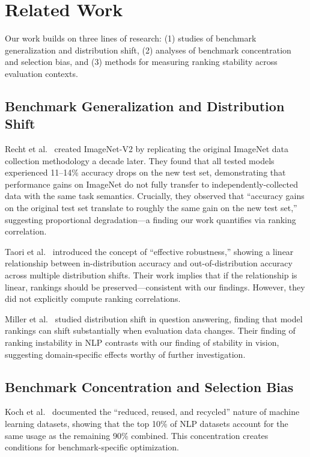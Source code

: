 \section{Related Work}
\label{sec:related}

Our work builds on three lines of research: (1) studies of benchmark generalization and distribution shift, (2) analyses of benchmark concentration and selection bias, and (3) methods for measuring ranking stability across evaluation contexts.

\subsection{Benchmark Generalization and Distribution Shift}

Recht et al.~\cite{recht2019imagenet} created ImageNet-V2 by replicating the original ImageNet data collection methodology a decade later. They found that all tested models experienced 11--14\% accuracy drops on the new test set, demonstrating that performance gains on ImageNet do not fully transfer to independently-collected data with the same task semantics. Crucially, they observed that ``accuracy gains on the original test set translate to roughly the same gain on the new test set,'' suggesting proportional degradation---a finding our work quantifies via ranking correlation.

Taori et al.~\cite{taori2020measuring} introduced the concept of ``effective robustness,'' showing a linear relationship between in-distribution accuracy and out-of-distribution accuracy across multiple distribution shifts. Their work implies that if the relationship is linear, rankings should be preserved---consistent with our findings. However, they did not explicitly compute ranking correlations.

Miller et al.~\cite{miller2021effect} studied distribution shift in question answering, finding that model rankings can shift substantially when evaluation data changes. Their finding of ranking instability in NLP contrasts with our finding of stability in vision, suggesting domain-specific effects worthy of further investigation.

\subsection{Benchmark Concentration and Selection Bias}

Koch et al.~\cite{koch2021reduced} documented the ``reduced, reused, and recycled'' nature of machine learning datasets, showing that the top 10\% of NLP datasets account for the same usage as the remaining 90\% combined. This concentration creates conditions for benchmark-specific optimization.

